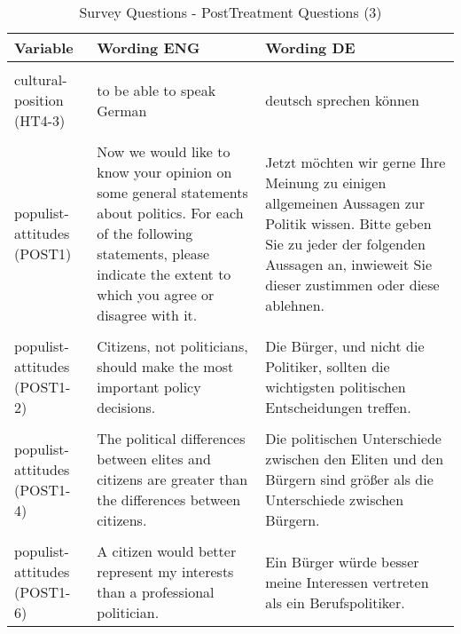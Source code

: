 \documentclass[]{article}
\begin{document}
\begin{table}[!h]

\caption{\label{tab:post}\label{tab:post3}Survey Questions - PostTreatment Questions (3)}
\centering
\begin{tabular}[t]{>{\raggedright\arraybackslash}p{3cm}>{\raggedright\arraybackslash}p{7cm}>{\raggedright\arraybackslash}p{7cm}}
\toprule
Variable & Wording ENG & Wording DE\\
\midrule
\cellcolor{gray!6}{cultural-position (HT4-2)} & \cellcolor{gray!6}{to have German ancestors} & \cellcolor{gray!6}{deutsche Vorfahren haben}\\
cultural-position (HT4-3) & to be able to speak German & deutsch sprechen können\\
\cellcolor{gray!6}{cultural-position (HT4-4)} & \cellcolor{gray!6}{to adhere to German traditions and customs} & \cellcolor{gray!6}{sich an deutsche Traditionen und Gepflogenheiten halten}\\
populist-attitudes (POST1) & Now we would like to know your opinion on some general statements about politics. For each of the following statements, please indicate the extent to which you agree or disagree with it. & Jetzt möchten wir gerne Ihre Meinung zu einigen allgemeinen Aussagen zur Politik wissen. Bitte geben Sie zu jeder der folgenden Aussagen an, inwieweit Sie dieser zustimmen oder diese ablehnen.\\
\cellcolor{gray!6}{populist-attitudes (POST1-1)} & \cellcolor{gray!6}{What is called compromise in politics is really just a betrayal of principles.} & \cellcolor{gray!6}{Was in der Politik Kompromiss genannt wird, ist in Wirklichkeit nur ein Verrat von Prinzipien.}\\
\addlinespace
populist-attitudes (POST1-2) & Citizens, not politicians, should make the most important policy decisions. & Die Bürger, und nicht die Politiker, sollten die wichtigsten politischen Entscheidungen treffen.\\
\cellcolor{gray!6}{populist-attitudes (POST1-3)} & \cellcolor{gray!6}{The members of the German Bundestag must follow the will of the citizens.} & \cellcolor{gray!6}{Die Abgeordneten des Deutschen Bundestags müssen dem Willen der Bürger Folge leisten.}\\
populist-attitudes (POST1-4) & The political differences between elites and citizens are greater than the differences between citizens. & Die politischen Unterschiede zwischen den Eliten und den Bürgern sind größer als die Unterschiede zwischen Bürgern.\\
\cellcolor{gray!6}{populist-attitudes (POST1-5)} & \cellcolor{gray!6}{Elected officials talk too much and take too little action} & \cellcolor{gray!6}{Die Politiker reden zu viel und machen zu wenig.}\\
populist-attitudes (POST1-6) & A citizen would better represent my interests than a professional politician. & Ein Bürger würde besser meine Interessen vertreten als ein Berufspolitiker.\\
\bottomrule
\end{tabular}
\end{table}
\end{document}

